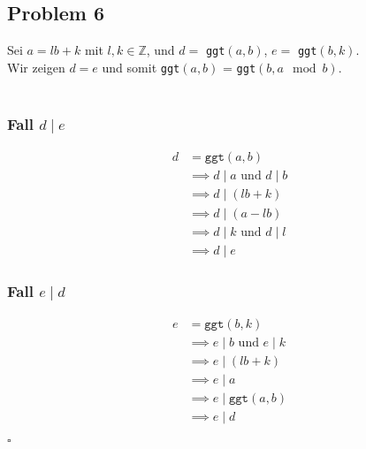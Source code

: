 \documentclass[12pt, german]{article}
\newcommand{\bewiesen}{\begin{flushright}$\square$ \end{flushright} }
\begin{document}
    \subsection*{Problem 6}
 	Sei $a = lb + k$ mit $l,k \in \mathbb{Z}$, und $d=$ \texttt{ggt$(a,b)$}, $e=$ \texttt{ggt$(b,k)$}.\\ Wir zeigen $d = e$ und somit \texttt{ggt$(a,b)$} = \texttt{ggt$(b,a\mod b)$}. 
\\ \\
 \begin{minipage}[b]{0,5\textwidth}
   \subsubsection*{Fall $d \mid e$}
   \begin{align*}
   	d &= \texttt{ggt}(a,b) \\
   	&\implies d \mid a \text{ und } d \mid b \\
   	&\implies d \mid (lb + k) \\
   	&\implies d \mid (a - lb) \\
   	&\implies d \mid k \text{ und } d \mid l \\
   	&\implies d \mid e
    \end{align*} 
\end{minipage}
\begin{minipage}[b]{0,5\textwidth}
  \subsubsection*{Fall $e \mid d$}
    \begin{align*}
    	e &= \texttt{ggt}(b,k) \\
    		&\implies e \mid b \text{ und } e \mid k \\
    		&\implies e \mid  (lb +k) \\
    		&\implies e \mid a \\
    		&\implies e \mid \texttt{ggt}(a,b) \\
    		&\implies e \mid d
    \end{align*} 
\end{minipage}
    \bewiesen
    		
    
    
    
\end{document}
